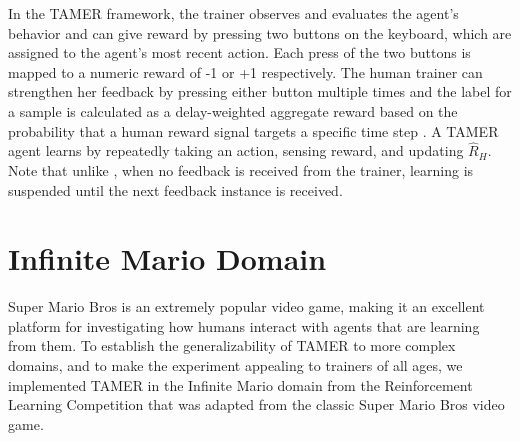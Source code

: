 \documentclass[10pt,journal,compsoc]{IEEEtran}
\begin{document}
In the TAMER framework, the trainer observes and evaluates the agent's behavior and can give reward %
by pressing two buttons on the keyboard, which are assigned to the agent's most recent action. Each press of the two buttons is mapped to a numeric reward of -1 or +1 respectively. The human trainer can strengthen her feedback by pressing either button multiple times and the label for a sample is calculated as a delay-weighted aggregate reward based on the probability that a human reward signal targets a specific time step \cite{knox2012learning}.  %
A TAMER agent learns by repeatedly taking an action, sensing reward, and updating $\hat{R}_{H}$. Note that unlike \cite{knox2012learning}, when no feedback is received from the trainer, learning is suspended until the next feedback instance is received. 



\section{Infinite Mario Domain}
\label{sec:domain}

Super Mario Bros is an extremely popular video game, %
making it an excellent platform for investigating how humans interact with agents that are learning from them. %
To establish the generalizability of TAMER to more complex domains, and to make the experiment appealing to trainers of all ages, we implemented TAMER in the Infinite Mario domain from the Reinforcement Learning Competition \cite{whiteson2010reinforcement,dimitrakakis2014reinforcement} that was adapted from the classic Super Mario Bros video game. %
\end{document}
